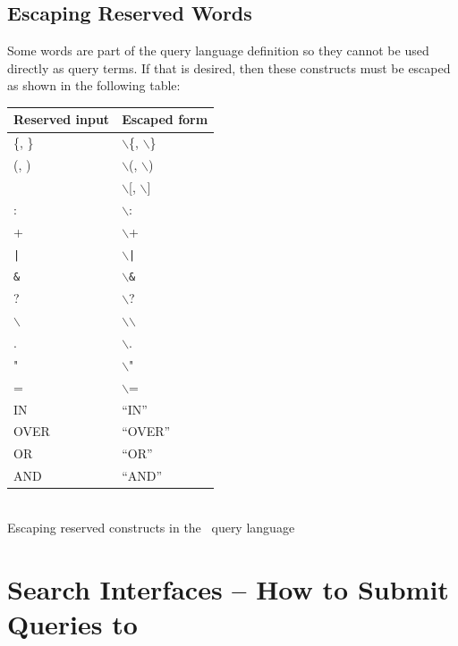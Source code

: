 \subsection{Escaping Reserved Words}

Some words are part of the query language definition so they cannot be used
directly as query terms. If that is desired, then these constructs must be
escaped as shown in the following table:
\begin{center}
\begin{tabular}{|l|l|}
\hline
{\bf Reserved input} & {\bf Escaped form}\\
\hline \hline
\{, \} &  $\backslash$\{, $\backslash$\}\\
\hline
(, )  & $\backslash$(, $\backslash$) \\
\hline
[, ] & $\backslash$[, $\backslash$]\\
\hline
: &  $\backslash$: \\
\hline
+ &  $\backslash$+ \\
\hline
{\tt |} &  $\backslash${\tt |} \\
\hline
{\tt \&} &  $\backslash${\tt \&} \\
\hline
? &  $\backslash$? \\
\hline
$\backslash$ &  $\backslash$$\backslash$ \\
\hline
. &  $\backslash$. \\
\hline
" &  $\backslash$" \\
\hline 
=  & $\backslash$= \\
\hline
IN & ``IN'' \\
\hline
OVER & ``OVER''\\ 
\hline
OR & ``OR''\\ 
\hline
AND & ``AND''\\ 
\hline
\end{tabular}\\
\vspace{1ex}
Escaping reserved constructs in the \Mimir\ query language
\end{center}


\section{Search Interfaces -- How to Submit Queries to \Mimir}
\label{sec:search:interfaces}

